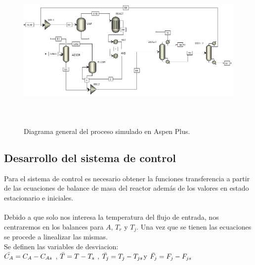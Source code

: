         \begin{figure}[H]
            \centering
            \includegraphics[width=16cm, height=8cm]{images/Diagramageneral.eps}
            \caption{Diagrama general del proceso simulado en Aspen Plus.}
            \label{fig:DiagramaCHIDO}
        \end{figure}

    \subsection*{Desarrollo del sistema de control}
    Para el sistema de control es necesario obtener la funciones transferencia a partir de las ecuaciones de balance de masa  del reactor además de los valores en estado estacionario  e iniciales.
    \paragraph{}
    Debido a que solo nos interesa la temperatura del flujo de entrada, nos centraremos en los balances para $A$, $T_r$ y $T_j$. Una vez que se tienen las ecuaciones se procede a linealizar las mismas.\\
    Se definen las variables de desviacion:\\
        $\Bar{C_A}= C_A - C_{As} $  ,  $\Bar{T}= T - T_s $  , $\Bar{T_j}= T_j - T_{js}$y $\Bar{F_j}= F_j - F_{js}$   


